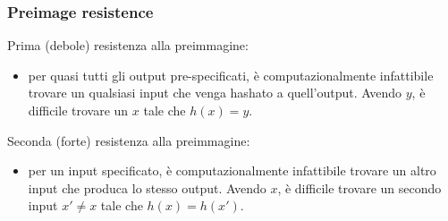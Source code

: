 \begin{frame}
\frametitle{Preimage resistence}
Prima (debole) resistenza alla preimmagine:
\begin{itemize}
    \item per quasi tutti gli output pre-specificati, è computazionalmente infattibile trovare un qualsiasi input che venga hashato a quell'output.
    Avendo \( y \), è difficile trovare un \( x \) tale che \( h(x) = y \).
\end{itemize}
Seconda (forte) resistenza alla preimmagine:
\begin{itemize}
    \item per un input specificato, è computazionalmente infattibile trovare un altro input che produca lo stesso output.
     Avendo \( x \), è difficile trovare un secondo input \( x' \neq x \) tale che \( h(x) = h(x') \).
\end{itemize}

\end{frame}
